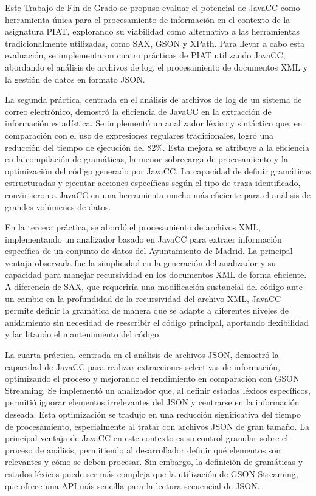 \noindent Este Trabajo de Fin de Grado se propuso evaluar el potencial de JavaCC como herramienta única para el procesamiento de información en el contexto de la asignatura PIAT, explorando su viabilidad como alternativa a las herramientas tradicionalmente utilizadas, como SAX, GSON y XPath. Para llevar a cabo esta evaluación, se implementaron cuatro prácticas de PIAT utilizando JavaCC, abordando el análisis de archivos de log, el procesamiento de documentos XML y la gestión de datos en formato JSON.

La segunda práctica, centrada en el análisis de archivos de log de un sistema de correo electrónico, demostró la eficiencia de JavaCC en la extracción de información estadística. Se implementó un analizador léxico y sintáctico que, en comparación con el uso de expresiones regulares tradicionales, logró una reducción del tiempo de ejecución del 82\%. Esta mejora se atribuye a la eficiencia en la compilación de gramáticas, la menor sobrecarga de procesamiento y la optimización del código generado por JavaCC. La capacidad de definir gramáticas estructuradas y ejecutar acciones específicas según el tipo de traza identificado, convirtieron a JavaCC en una herramienta mucho más eficiente para el análisis de grandes volúmenes de datos.

En la tercera práctica, se abordó el procesamiento de archivos XML, implementando un analizador basado en JavaCC para extraer información específica de un conjunto de datos del Ayuntamiento de Madrid. La principal ventaja observada fue la simplicidad en la generación del analizador y su capacidad para manejar recursividad en los documentos XML de forma eficiente. A diferencia de SAX, que requeriría una modificación sustancial del código ante un cambio en la profundidad de la recursividad del archivo XML, JavaCC permite definir la gramática de manera que se adapte a diferentes niveles de anidamiento sin necesidad de reescribir el código principal, aportando flexibilidad y facilitando el mantenimiento del código.


La cuarta práctica, centrada en el análisis de archivos JSON, demostró la capacidad de JavaCC para realizar extracciones selectivas de información, optimizando el proceso y mejorando el rendimiento en comparación con GSON Streaming. Se implementó un analizador que, al definir estados léxicos específicos, permitió ignorar elementos irrelevantes del JSON y centrarse en la información deseada. Esta optimización se tradujo en una reducción significativa del tiempo de procesamiento, especialmente al tratar con archivos JSON de gran tamaño. La principal ventaja de JavaCC en este contexto es su control granular sobre el proceso de análisis, permitiendo al desarrollador definir qué elementos son relevantes y cómo se deben procesar. Sin embargo, la definición de gramáticas y estados léxicos puede ser más compleja que la utilización de GSON Streaming, que ofrece una API más sencilla para la lectura secuencial de JSON.


